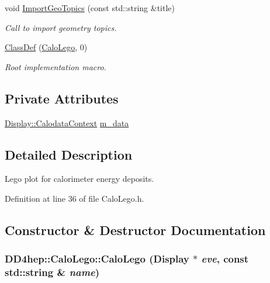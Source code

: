 \begin{DoxyCompactItemize}
void \hyperlink{class_d_d4hep_1_1_calo_lego_ac70c1949f20282374d052be75356ad2e}{ImportGeoTopics} (const std::string \&title)
\begin{DoxyCompactList}\small\item\em Call to import geometry topics. \item\end{DoxyCompactList}\item 
\hyperlink{class_d_d4hep_1_1_calo_lego_a1a4c9c092acfa08adb65b7fe594fa7fd}{ClassDef} (\hyperlink{class_d_d4hep_1_1_calo_lego}{CaloLego}, 0)
\begin{DoxyCompactList}\small\item\em Root implementation macro. \item\end{DoxyCompactList}\end{DoxyCompactItemize}
\subsection*{Private Attributes}
\begin{DoxyCompactItemize}
\item 
\hyperlink{struct_d_d4hep_1_1_display_1_1_calodata_context}{Display::CalodataContext} \hyperlink{class_d_d4hep_1_1_calo_lego_a2d5755595411d469277f8e9c823eb510}{m\_\-data}
\end{DoxyCompactItemize}


\subsection{Detailed Description}
Lego plot for calorimeter energy deposits. 

Definition at line 36 of file CaloLego.h.

\subsection{Constructor \& Destructor Documentation}
\hypertarget{class_d_d4hep_1_1_calo_lego_abeda4832cbd7103bbd3b1d4bfe2fe1dc}{
\subsubsection[{CaloLego}]{\setlength{\rightskip}{0pt plus 5cm}DD4hep::CaloLego::CaloLego ({\bf Display} $\ast$ {\em eve}, \/  const std::string \& {\em name})}}
\label{class_d_d4hep_1_1_calo_lego_abeda4832cbd7103bbd3b1d4bfe2fe1dc}


